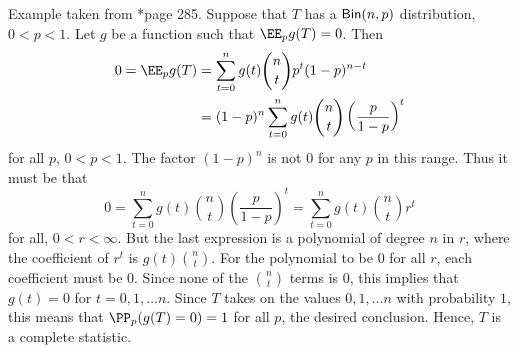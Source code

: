 \begin{exam} \label{exam: bin_comp_stat}
    Example taken from \cite{CasellaGeorge2001SI}*{page 285}. Suppose that $T$ has a ${\sf Bin} (n,p)$ distribution, $0<p<1$. Let $g$ be a function such that $\EE_{p} g(T) = 0$. Then
    \begin{align*}
        0 = \EE_{p} g(T) & = \sum_{t=0}^{n} g(t) \binom{n}{t} p^{t} (1-p)^{n-t}                        \\
                         & = (1-p)^n \sum_{t=0}^{n} g(t) \binom{n}{t} \left( \frac{p}{1-p} \right)^{t}
    \end{align*}
    for all $p$, $0<p<1$. The factor $(1-p)^n$ is not 0 for any $p$ in this range. Thus it must be that
    \begin{equation*}
        0 = \sum_{t=0}^{n} g(t) \binom{n}{t} \left( \frac{p}{1-p} \right)^{t} = \sum_{t=0}^{n} g(t) \binom{n}{t} r^t
    \end{equation*}
    for all, $0 < r < \infty$. But the last expression is a polynomial of degree $n$ in $r$, where the coefficient of $r^t$ is $g(t) \binom{n}{t}$. For the polynomial to be $0$ for all $r$, each coefficient must be $0$. Since none of the $\binom{n}{t}$ terms is $0$, this implies that $g(t) = 0$ for $t=0,1,\ldots n$. Since $T$ takes on the values $0,1,\ldots n$ with probability $1$, this means that $\PP_p (g(T) = 0) = 1$ for all $p$, the desired conclusion. Hence, $T$ is a complete statistic.
\end{exam}


